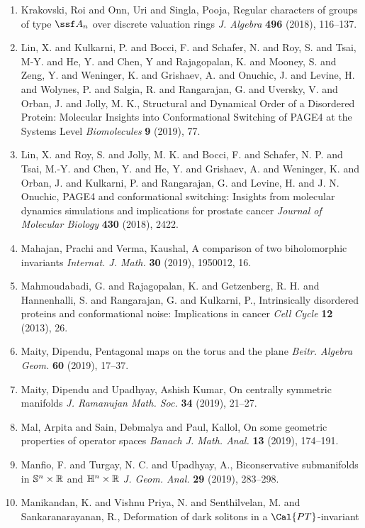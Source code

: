 \begin{enumerate}
\item Krakovski, Roi and Onn, Uri and Singla, Pooja, Regular characters of groups of type {$\ssf A_n$} over
discrete valuation rings {\em J. Algebra} {\bf 496} (2018), 116--137.
\item Lin, X. and Kulkarni, P. and Bocci, F. and Schafer, N. and Roy, S. and Tsai, M-Y. and He, Y. and Chen, Y and Rajagopalan, K. and Mooney, S. and Zeng, Y. and Weninger, K. and Grishaev, A. and Onuchic, J. and Levine, H. and Wolynes, P. and Salgia, R. and Rangarajan, G. and Uversky, V. and Orban, J. and Jolly, M. K., Structural and Dynamical Order of a Disordered Protein: Molecular Insights into Conformational Switching of PAGE4 at the Systems Level {\em Biomolecules} {\bf 9} (2019), 77.
\item Lin, X. and Roy, S. and Jolly, M. K. and Bocci, F. and Schafer, N. P. and Tsai, M.-Y. and Chen, Y. and He, Y. and Grishaev, A. and Weninger, K. and Orban, J. and Kulkarni, P. and Rangarajan, G. and Levine, H. and J. N. Onuchic, PAGE4 and conformational switching: Insights from molecular dynamics simulations and implications for prostate cancer {\em Journal of Molecular Biology} {\bf 430} (2018), 2422.
\item Mahajan, Prachi and Verma, Kaushal, A comparison of two biholomorphic invariants {\em Internat. J. Math.} {\bf 30} (2019), 1950012, 16.
\item Mahmoudabadi, G. and Rajagopalan, K. and Getzenberg, R. H. and Hannenhalli, S. and Rangarajan, G. and Kulkarni, P., Intrinsically disordered proteins and conformational noise: Implications in cancer {\em Cell Cycle} {\bf 12} (2013), 26.
\item Maity, Dipendu, Pentagonal maps on the torus and the plane {\em Beitr. Algebra Geom.} {\bf 60} (2019), 17--37.
\item Maity, Dipendu and Upadhyay, Ashish Kumar, On centrally symmetric manifolds {\em J. Ramanujan Math. Soc.} {\bf 34} (2019), 21--27.
\item Mal, Arpita and Sain, Debmalya and Paul, Kallol, On some geometric properties of operator spaces {\em Banach J. Math. Anal.} {\bf 13} (2019), 174--191.
\item Manfio, F. and Turgay, N. C. and Upadhyay, A., Biconservative submanifolds in {$\Bbb{S}^n\times\Bbb{R}$} and
{$\Bbb{H}^n\times\Bbb{R}$} {\em J. Geom. Anal.} {\bf 29} (2019), 283--298.
\item Manikandan, K. and Vishnu Priya, N. and Senthilvelan, M. and
Sankaranarayanan, R., Deformation of dark solitons in a {$\Cal{PT}$}-invariant

\end{enumerate}
